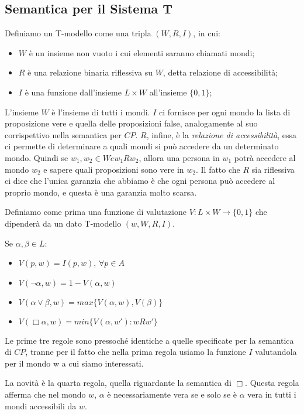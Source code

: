 \documentclass[a4paper, 12pt]{article}
\begin{document}
\subsection{Semantica per il Sistema T}
Definiamo un T-modello come una tripla $(W, R, I)$, in cui:
\begin{itemize}
\item $W$ è un insieme non vuoto i cui elementi saranno chiamati mondi;
\item $R$ è una relazione binaria riflessiva su $W$, detta relazione di accessibilità;
\item $I$ è una funzione dall'insieme $L \times W$ all'insieme $\{0, 1\}$;
\end{itemize}

L'insieme $W$ è l'insieme di tutti i mondi.
$I$ ci fornisce per ogni mondo la lista di proposizione vere
e quella delle proposizioni false, analogamente al suo corrispettivo nella semantica per $CP$.
$R$, infine, è la \textit{relazione di accessibilità},
essa ci permette di determinare a quali mondi si può accedere da un determinato mondo.
Quindi se $w_1, w_2 \in W e w_1 R w_2$, allora una persona in $w_1$ potrà accedere
al mondo $w_2$ e sapere quali proposizioni sono vere in $w_2$.
Il fatto che $R$ sia riflessiva ci dice che l'unica garanzia che abbiamo
è che ogni persona può accedere al proprio mondo, e questa è una garanzia molto scarsa.

Definiamo come prima una funzione di valutazione $V : L \times W \to \{0, 1\}$ che dipenderà da un dato T-modello
$(w, W, R, I)$.

Se $\alpha, \beta \in L$:
\begin{itemize}
\item $V(p, w) = I(p, w)$, $\forall p \in A$
\item $V(\neg \alpha, w) = 1 - V(\alpha, w)$
\item $V(\alpha \vee \beta, w) = max\{V(\alpha, w), V(\beta)\}$
\item $V(\Box \alpha, w) = min\{ V(\alpha, w') : w R w' \}$
\end{itemize}

Le prime tre regole sono pressoché identiche a quelle specificate per la semantica di $CP$,
tranne per il fatto che nella prima regola usiamo la funzione $I$ valutandola per il mondo w
a cui siamo interessati.

La novità è la quarta regola, quella riguardante la semantica di $\Box$.
Questa regola afferma che nel mondo $w$, $\alpha$ è necessariamente vera se e solo se
è $\alpha$ vera in tutti i mondi accessibili da $w$.
\end{document}
